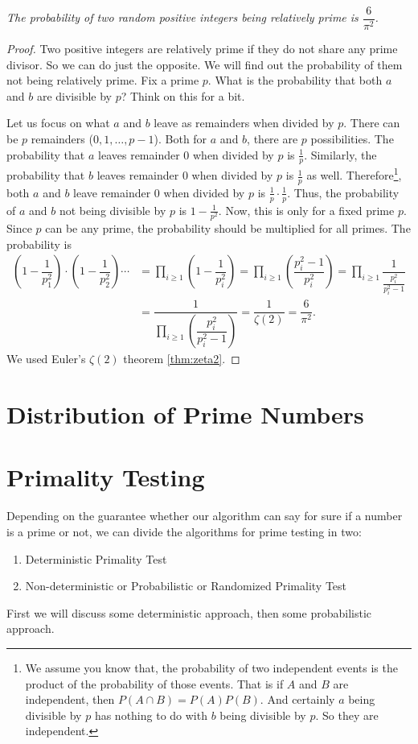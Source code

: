 \documentclass{subfiles}
\begin{document}
	\begin{theorem}\slshape
		The probability of two random positive integers being relatively prime is $\dfrac{6}{\pi^2}$.
	\end{theorem}

	\begin{proof}
		Two positive integers are relatively prime if they do not share any prime divisor. So we can do just the opposite. We will find out the probability of them not being relatively prime. Fix a prime $p$. What is the probability that both $a$ and $b$ are divisible by $p$? Think on this for a bit.

		Let us focus on what $a$ and $b$ leave as remainders when divided by $p$. There can be $p$ remainders ($0,1,\ldots,p-1$). Both for $a$ and $b$, there are $p$ possibilities. The probability that $a$ leaves remainder $0$ when divided by $p$ is $\frac{1}{p}$. Similarly, the probability that $b$ leaves remainder $0$ when divided by $p$ is $\frac{1}{p}$ as well. Therefore\footnote{We assume you know that, the probability of two independent events is the product of the probability of those events. That is if $A$ and $B$ are independent, then $P(A\cap B)=P(A)P(B)$. And certainly $a$ being divisible by $p$ has nothing to do with $b$ being divisible by $p$. So they are independent.}, both $a$ and $b$ leave remainder $0$ when divided by $p$ is $\frac{1}{p}\cdot\frac{1}{p}$. Thus, the probability of $a$ and $b$ not being divisible by $p$ is $1-\frac{1}{p^2}$. Now, this is only for a fixed prime $p$. Since $p$ can be any prime, the probability should be multiplied for all primes. The probability is
			\begin{align*}
				\left(1-\dfrac{1}{p_1^2}\right)\cdot\left(1-\dfrac{1}{p_2^2}\right)\cdots
				& = \prod_{i\geq1}\left(1-\dfrac{1}{p_i^2}\right) = \prod_{i\geq1}\left(\dfrac{p_i^2-1}{p_i^2}\right) = \prod_{i\geq1}\dfrac{1}{\frac{p_i^2}{p_i^2-1}}\\
				& = \dfrac{1}{\prod_{i\geq1}\left(\dfrac{p_i^2}{p_i^2-1}\right)}  = \dfrac{1}{\zeta(2)} = \dfrac{6}{\pi^2}.
			\end{align*}
		We used Euler's $\zeta(2)$ theorem \autoref{thm:zeta2}.
	\end{proof}

\section{Distribution of Prime Numbers}
	


\section{Primality Testing}\label{sec:primalitytesting}
	Depending on the guarantee whether our algorithm can say for sure if a number is a prime or not, we can divide the algorithms for prime testing in two:
		\begin{enumerate}
			\item Deterministic Primality Test
			\item Non-deterministic or Probabilistic or Randomized Primality Test
		\end{enumerate}
	First we will discuss some deterministic approach, then some probabilistic approach.
\end{document}
